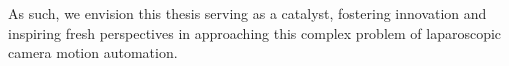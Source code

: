 As such, we envision this thesis serving as a catalyst, fostering innovation and inspiring fresh perspectives in approaching this complex problem of laparoscopic camera motion automation.


